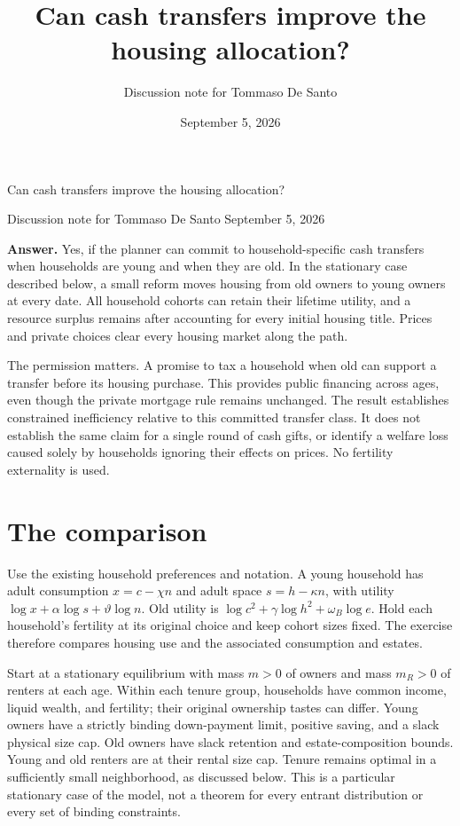 \documentclass[11pt]{article}
\title{Can cash transfers improve the housing allocation?}
\author{Discussion note for Tommaso De Santo}
\date{September 5, 2026}
\begin{document}
\begin{center}
{\LARGE Can cash transfers improve the housing allocation?}\par
\vspace{0.6em}
Discussion note for Tommaso De Santo \quad September 5, 2026
\end{center}
\vspace{0.4em}

\textbf{Answer.} Yes, if the planner can commit to household-specific cash
transfers when households are young and when they are old. In the stationary
case described below, a small reform moves housing from old owners to young
owners at every date. All household cohorts can retain their lifetime utility,
and a resource surplus remains after accounting for every initial housing
title. Prices and private choices clear every housing market along the path.

The permission matters. A promise to tax a household when old can support a
transfer before its housing purchase. This provides public financing across
ages, even though the private mortgage rule remains unchanged. The result
establishes constrained inefficiency relative to this committed transfer class.
It does not establish the same claim for a single round of cash gifts, or
identify a welfare loss caused solely by households ignoring their effects on
prices. No fertility externality is used.

\section{The comparison}

Use the existing household preferences and notation. A young household has
adult consumption $x=c-\chi n$ and adult space $s=h-\kappa n$, with utility
$\log x+\alpha\log s+\vartheta\log n$. Old utility is
$\log c^2+\gamma\log h^2+\omega_B\log e$. Hold each household's fertility
at its original choice and keep cohort sizes fixed. The exercise therefore
compares housing use and the associated consumption and estates.

Start at a stationary equilibrium with mass $m>0$ of owners and mass $m_R>0$
of renters at each age. Within each tenure group, households have common
income, liquid wealth, and fertility; their original ownership tastes can
differ. Young owners have a strictly binding down-payment limit, positive
saving, and a slack physical size cap. Old owners have slack retention and
estate-composition bounds. Young and old renters are at their rental size cap.
Tenure remains optimal in a sufficiently small neighborhood, as discussed below.
This is a particular stationary case of the model, not a theorem for every
entrant distribution or every set of binding constraints.
\end{document}
